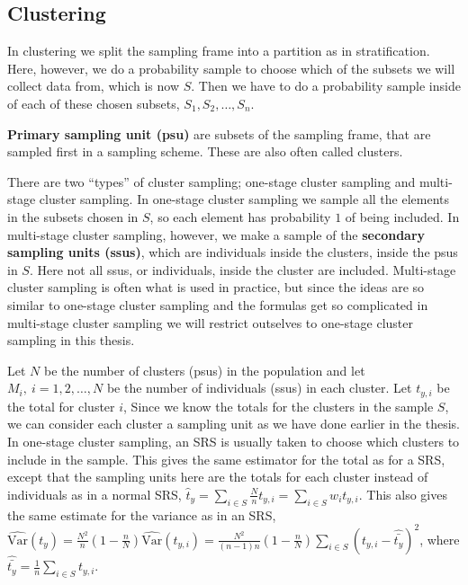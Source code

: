 \documentclass{article}
\begin{document}
\subsection{Clustering} \label{sec:clustering}


In clustering we split the sampling frame into a partition as in stratification.
Here, however, we do a probability sample to choose which of the subsets we will
collect data from, which is now \(S\). Then we have to do a probability sample
inside of each of these chosen subsets, \(S_1, S_2, \dots, S_n\).

\begin{definition}
 \textbf{Primary sampling unit (psu)} are subsets of the sampling frame, that
 are sampled first in a sampling scheme. These are also often called clusters. 
\end{definition}

There are two ``types'' of cluster sampling; one-stage cluster sampling and
multi-stage cluster sampling. In one-stage cluster sampling we sample all the
elements in the subsets chosen in \(S\), so each element has probability \(1\)
of being included. In multi-stage cluster sampling, however,
we make a sample of the \textbf{secondary sampling units (ssus)}, which are
individuals inside the clusters, inside the psus in \(S\). Here not all ssus, or
individuals, inside the cluster are included. Multi-stage cluster sampling is often what is used in
practice, but since the ideas are so similar to one-stage cluster sampling and
the formulas get so complicated in multi-stage cluster sampling
we will restrict outselves to one-stage cluster sampling in this thesis.

Let \(N\) be the number of clusters (psus) in the population and let \(M_i,\ i =
1, 2, \dots, N\) be the number of individuals (ssus) in each cluster. Let
\(t_{y, i}\) be the total for cluster \(i\), Since we know the totals for the
clusters in the sample \(S\), we can consider each cluster a sampling unit as we
have done earlier in the thesis. In one-stage cluster sampling, an SRS is
usually taken to choose which clusters to include in the sample. This gives the
same estimator for the total as for a SRS, except that the sampling units here
are the totals for each cluster instead of individuals as in a normal SRS,
\(\hat{t}_y = \sum_{i \in S} \frac{N}{n} t_{y, i} = \sum_{i \in S} w_i t_{y, i} \). 
This also gives the same estimate for the variance as in an SRS,
\(\widehat{\mathrm{Var}}\left(t_{y}\right) = \frac{N^2}{n} \left( 1 - \frac{n}{N}
\right) \hat{\mathrm{Var}}\left( t_{y, i} \right) =
\frac{N^2}{\left( n - 1 \right)n} \left( 1 - \frac{n}{N} \right) \sum_{i \in S}
\left( t_{y, i} - \hat{\bar{t_y}} \right)^2\), where \(\hat{\bar{t_y}} =
\frac{1}{n} \sum_{i \in S} t_{y, i}\).
\end{document}
